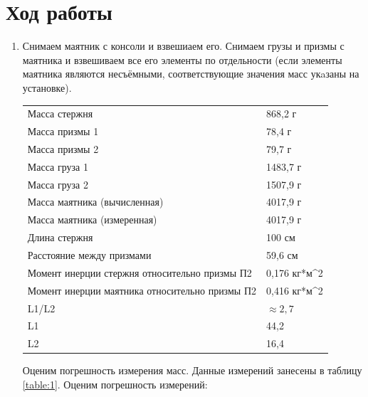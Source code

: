 \documentclass[a4paper, 12pt]{article}
\begin{document}
\section{Ход работы}
\begin{enumerate}
    \item Снимаем маятник с консоли и взвешиаем его. Снимаем грузы и призмы с маятника и взвешиваем все его элементы по отдельности (если элементы маятника являются несъёмными, соответствующие значения масс укaзаны на установке). \newline
\begin{tabular}{ll}\label{table:1}
Масса стержня                                  & 868,2 г                       \\
Масса призмы 1                                 & 78,4 г                        \\
Масса призмы 2                                 & 79,7 г                        \\
Масса груза 1                                  & 1483,7 г                      \\
Масса груза 2                                  & 1507,9 г                      \\
Масса маятника (вычисленная)                   & 4017,9 г                      \\
Масса маятника (измеренная)                    & 4017,9 г                      \\
Длина стержня                                  & 100 см                        \\
Расстояние между призмами                      & 59,6 см                       \\
Момент инерции стержня относительно призмы П2  & 0,176 кг*м\textasciicircum{}2 \\
Момент инерции маятника относительно призмы П2 & 0,416 кг*м\textasciicircum{}2 \\
L1/L2                                          & $\approx 2,7$                   \\
L1                                             & 44,2                          \\
L2                                             & 16,4                          \\
\end{tabular}
    \newline
    \vspace{10}
    Оценим погрешность измерения масс.\newline
    Данные измерений занесены в таблицу \ref{table:1}. Оценим погрешность измерений:

\end{enumerate}
\end{document}
